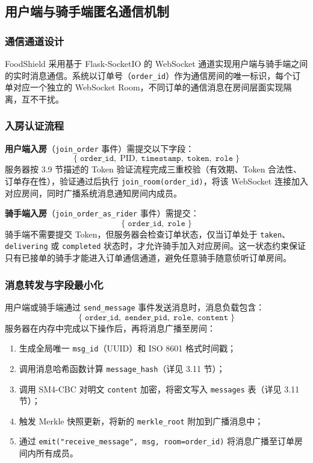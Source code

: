 \subsection{用户端与骑手端匿名通信机制}
\label{subsec:anon_comm}

\subsubsection*{通信通道设计}

FoodShield 采用基于 Flask-SocketIO 的 WebSocket 通道实现用户端与骑手端之间的实时消息通信。系统以订单号（\texttt{order\_id}）作为通信房间的唯一标识，每个订单对应一个独立的 WebSocket Room，不同订单的通信消息在房间层面实现隔离，互不干扰。



\subsubsection*{入房认证流程}

\textbf{用户端入房}（\texttt{join\_order} 事件）需提交以下字段：
\[
  \{\;\texttt{order\_id},\;\mathrm{PID},\;\texttt{timestamp},\;\texttt{token},\;\texttt{role}\;\}
\]
服务器按 3.9 节描述的 Token 验证流程完成三重校验（有效期、Token 合法性、订单存在性），验证通过后执行 \texttt{join\_room(order\_id)}，将该 WebSocket 连接加入对应房间，同时广播系统消息通知房间内成员。

\textbf{骑手端入房}（\texttt{join\_order\_as\_rider} 事件）需提交：
\[
  \{\;\texttt{order\_id},\;\texttt{role}\;\}
\]
骑手端不需要提交 Token，但服务器会检查订单状态，仅当订单处于 \texttt{taken}、\texttt{delivering} 或 \texttt{completed} 状态时，才允许骑手加入对应房间。这一状态约束保证只有已接单的骑手才能进入订单通信通道，避免任意骑手随意侦听订单房间。

\subsubsection*{消息转发与字段最小化}

用户端或骑手端通过 \texttt{send\_message} 事件发送消息时，消息负载包含：
\[
  \{\;\texttt{order\_id},\;\texttt{sender\_pid},\;\texttt{role},\;\texttt{content}\;\}
\]
服务器在内存中完成以下操作后，再将消息广播至房间：

\begin{enumerate}[label=\arabic*., leftmargin=2em]
  \item 生成全局唯一 \texttt{msg\_id}（UUID）和 ISO 8601 格式时间戳；
  \item 调用消息哈希函数计算 \texttt{message\_hash}（详见 3.11 节）；
  \item 调用 SM4-CBC 对明文 \texttt{content} 加密，将密文写入 \texttt{messages} 表（详见 3.11 节）；
  \item 触发 Merkle 快照更新，将新的 \texttt{merkle\_root} 附加到广播消息中；
  \item 通过 \texttt{emit("receive\_message", msg, room=order\_id)} 将消息广播至订单房间内所有成员。
\end{enumerate}

